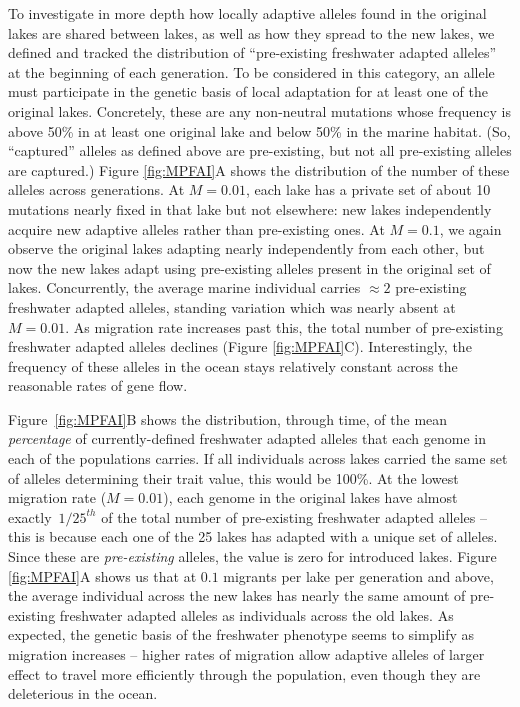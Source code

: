\documentclass{article}
\begin{document}
To investigate in more depth how locally adaptive alleles found in the original lakes are shared between lakes, as well as how they spread to the new lakes, we defined and tracked the distribution of ``pre-existing freshwater adapted alleles'' at the beginning of each generation. 
To be considered in this category, an allele must participate in the genetic basis of local adaptation for at least one of the original lakes. 
Concretely, these are any non-neutral mutations whose frequency is above 50\% in at least one original lake and below 50\% in the marine habitat. 
(So, ``captured'' alleles as defined above are pre-existing, but not all pre-existing alleles are captured.)
Figure \ref{fig:MPFAI}A shows the distribution of the number of these alleles across generations. At $M = 0.01$, each lake has a private set of about 10 mutations nearly fixed in that lake but not elsewhere: new lakes independently acquire new adaptive alleles rather than pre-existing ones. 
At $M = 0.1$, we again observe the original lakes adapting nearly independently from each other, but now the new lakes adapt using pre-existing alleles present in the original set of lakes. 
Concurrently, the average marine individual carries $\approx 2$ pre-existing freshwater adapted alleles, standing variation which was nearly absent at $M=0.01$. As migration rate increases past this, the total number of pre-existing freshwater adapted alleles declines (Figure \ref{fig:MPFAI}C). Interestingly, the frequency of these alleles in the ocean
stays relatively constant across the reasonable rates of gene flow.

Figure~\ref{fig:MPFAI}B shows the distribution, through time, of the mean \emph{percentage} of currently-defined freshwater adapted alleles that each genome in each of the populations carries. 
If all individuals across lakes carried the same set of alleles determining their trait value, this would be 100\%. At the lowest migration rate ($M = 0.01$), each genome in the original lakes have almost exactly~$1/25^{th}$ of the total number of pre-existing freshwater adapted alleles -- this is because each one of the 25 lakes has adapted with a unique set of alleles. 
Since these are \emph{pre-existing} alleles, the value is zero for introduced lakes. 
Figure \ref{fig:MPFAI}A shows us that at $0.1$ migrants per lake per generation and above, the average individual across the new lakes has nearly the same amount of pre-existing freshwater adapted alleles as individuals across the old lakes. 
As expected, the genetic basis of the freshwater phenotype seems to simplify as migration increases -- higher rates of migration allow adaptive alleles of larger effect to travel more efficiently through the population, even though they are deleterious in the ocean.
\end{document}

